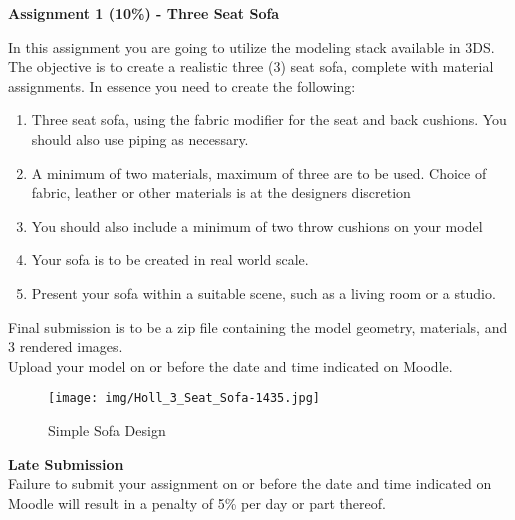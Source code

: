 
	
\begin{flushleft}
\Large\textbf{Assignment 1 (10\%) - Three Seat Sofa }\\
\end{flushleft}

In this assignment you are going to utilize the modeling stack available in 3DS.  The objective is to create a realistic three (3) seat sofa, complete with material assignments.  In essence you need to create the following:
\begin{enumerate}
	\item Three seat sofa, using the fabric modifier for the seat and back cushions.  You should also use piping as necessary.
	\item A minimum of two materials, maximum of three are to be used.  Choice of fabric, leather or other materials is at the designers discretion
	\item You should also include a minimum of two throw cushions on your model
	\item Your sofa is to be created in real world scale.
	\item Present your sofa within a suitable scene, such as a living room or a studio.
\end{enumerate}

Final submission is to be a zip file containing the model geometry, materials, and 3 rendered images.\\

Upload your model on or before the date and time indicated on Moodle.
\vspace{1cm}

\begin{figure}[hb]
	\centering
		\texttt{[image: img/Holl\_3\_Seat\_Sofa-1435.jpg]}
		\caption{Simple Sofa Design}
	\label{fig:Holl_3_Seat_Sofa-1435}
\end{figure}

\textbf{Late Submission}\\
Failure to submit your assignment on or before the date and time indicated on Moodle will result in a penalty of 5\% per day or part thereof.  

